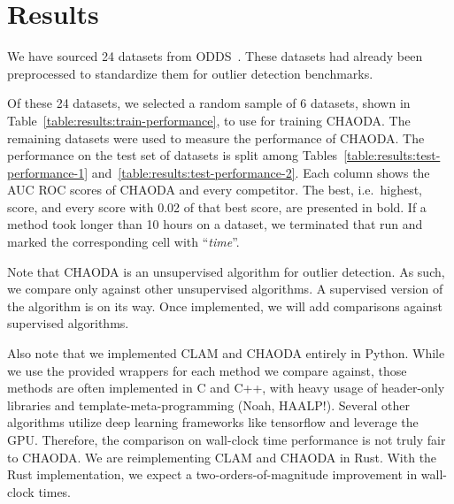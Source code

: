 \section{Results}
\label{sec:results}

We have sourced 24 datasets from ODDS~\cite{rayana2016odds}.
These datasets had already been preprocessed to standardize them for outlier detection benchmarks.

Of these 24 datasets, we selected a random sample of 6 datasets, shown in Table~\ref{table:results:train-performance}, to use for training CHAODA\@.
The remaining datasets were used to measure the performance of CHAODA\@.
The performance on the test set of datasets is split among Tables~\ref{table:results:test-performance-1} and~\ref{table:results:test-performance-2}.
Each column shows the AUC ROC scores of CHAODA and every competitor.
The best, i.e.\ highest, score, and every score with 0.02 of that best score, are presented in bold.
If a method took longer than 10 hours on a dataset, we terminated that run and marked the corresponding cell with ``\textit{time}''.

Note that CHAODA is an unsupervised algorithm for outlier detection.
As such, we compare only against other unsupervised algorithms.
A supervised version of the algorithm is on its way.
Once implemented, we will add comparisons against supervised algorithms.

Also note that we implemented CLAM and CHAODA entirely in Python.
While we use the provided wrappers for each method we compare against, those methods are often implemented in C and C++, with heavy usage of header-only libraries and template-meta-programming (Noah, HAALP!).
Several other algorithms utilize deep learning frameworks like tensorflow and leverage the GPU.
Therefore, the comparison on wall-clock time performance is not truly fair to CHAODA.
We are reimplementing CLAM and CHAODA in Rust.
With the Rust implementation, we expect a two-orders-of-magnitude improvement in wall-clock times.



